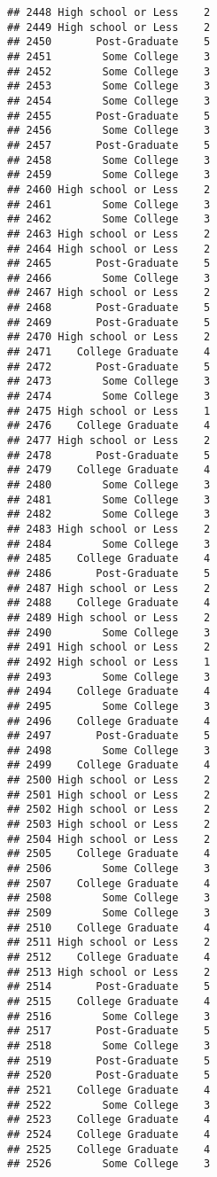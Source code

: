 \documentclass[
]{article}
\begin{document}
\begin{verbatim}
## 2448 High school or Less    2
## 2449 High school or Less    2
## 2450       Post-Graduate    5
## 2451        Some College    3
## 2452        Some College    3
## 2453        Some College    3
## 2454        Some College    3
## 2455       Post-Graduate    5
## 2456        Some College    3
## 2457       Post-Graduate    5
## 2458        Some College    3
## 2459        Some College    3
## 2460 High school or Less    2
## 2461        Some College    3
## 2462        Some College    3
## 2463 High school or Less    2
## 2464 High school or Less    2
## 2465       Post-Graduate    5
## 2466        Some College    3
## 2467 High school or Less    2
## 2468       Post-Graduate    5
## 2469       Post-Graduate    5
## 2470 High school or Less    2
## 2471    College Graduate    4
## 2472       Post-Graduate    5
## 2473        Some College    3
## 2474        Some College    3
## 2475 High school or Less    1
## 2476    College Graduate    4
## 2477 High school or Less    2
## 2478       Post-Graduate    5
## 2479    College Graduate    4
## 2480        Some College    3
## 2481        Some College    3
## 2482        Some College    3
## 2483 High school or Less    2
## 2484        Some College    3
## 2485    College Graduate    4
## 2486       Post-Graduate    5
## 2487 High school or Less    2
## 2488    College Graduate    4
## 2489 High school or Less    2
## 2490        Some College    3
## 2491 High school or Less    2
## 2492 High school or Less    1
## 2493        Some College    3
## 2494    College Graduate    4
## 2495        Some College    3
## 2496    College Graduate    4
## 2497       Post-Graduate    5
## 2498        Some College    3
## 2499    College Graduate    4
## 2500 High school or Less    2
## 2501 High school or Less    2
## 2502 High school or Less    2
## 2503 High school or Less    2
## 2504 High school or Less    2
## 2505    College Graduate    4
## 2506        Some College    3
## 2507    College Graduate    4
## 2508        Some College    3
## 2509        Some College    3
## 2510    College Graduate    4
## 2511 High school or Less    2
## 2512    College Graduate    4
## 2513 High school or Less    2
## 2514       Post-Graduate    5
## 2515    College Graduate    4
## 2516        Some College    3
## 2517       Post-Graduate    5
## 2518        Some College    3
## 2519       Post-Graduate    5
## 2520       Post-Graduate    5
## 2521    College Graduate    4
## 2522        Some College    3
## 2523    College Graduate    4
## 2524    College Graduate    4
## 2525    College Graduate    4
## 2526        Some College    3

\end{verbatim}
\end{document}
